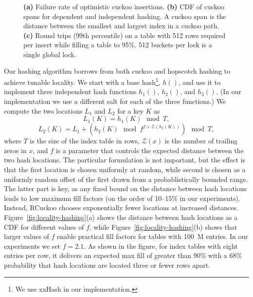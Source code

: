 \begin{figure}[t]
\begin{subfigure}{0.3\linewidth}
    \end{subfigure}
    \vspace{-1em}
    \caption{
    \textbf{(a)} Failure rate of optimistic cuckoo insertions.
    \textbf{(b)} CDF of cuckoo spans for dependent and independent hashing. A cuckoo span is the distance between the smallest and largest index in a cuckoo path.~
    \textbf{(c)} Round trips (99th percentile) on a table
    with 512 rows required per insert while filling a table
    to 95\%. 512 buckets per lock is a single global lock.}

    \label{fig:cuckoo-problems}

\end{figure}

Our hashing algorithm borrows from both cuckoo and hopscotch hashing
to achieve tunable locality.   We start with a base
hash\footnote{We use xxHash in our implementation.}, $h()$, and use it to
implement three independent hash functions $h_1()$, $h_2()$, and $h_3()$.
(In our implementation we use a different salt for each of the
three functions.)  We compute the two locations $L_1$ and $L_2$
for a key $K$ as
\[ L_1(K) = h_1(K)\mod T, \]
\[ L_2(K) = L_1 + (h_2(K)\mod f^{f+\mathcal{Z}(h_3(K))})\mod T, \]
\noindent where $T$ is the size of the index table in rows,
$\mathcal{Z}(x)$ is the number of trailing zeros in $x$, and $f$ is a
parameter that controls the expected distance between the two hash
locations.  The particular formulation is not important, but the
effect is that the first location is chosen uniformly at random, while
second is chosen as a uniformly random offset of the first drawn from
a probablistically bounded range.  The latter part is key, as any
fixed bound on the distance between hash locations leads to
low maximum fill factors (on the order of 10--15\% in our
experiments).  Instead, RCuckoo chooses exponentially fewer locations
at increased distances.  Figure~\ref{fig:locality-hashing}(a) shows
the distance between hash locations as a CDF for different values of
$f$,
while Figure~\ref{fig:locality-hashing}(b) shows that larger values of
$f$ enable practical fill factors for tables with 100~M entries. In
our experiments we set $f=2.1$.  As shown in the figure, for index
tables with eight entries per row, it delivers an expected max fill of
greater than 90\% with a 68\% probability that hash locations are
located three or fewer rows apart.



